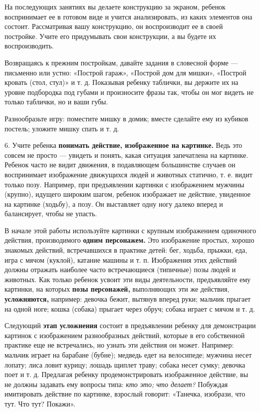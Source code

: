 \documentclass[a5paper]{book}
\renewcommand{\emph}[1]{\textit{#1}}
\begin{document}
На последующих занятиях вы делаете конструкцию за экраном, ребенок
воспринимает ее в готовом виде и учится анализировать, из каких
элементов она состоит. Рассматривая вашу конструкцию, он воспроизводит
ее в своей постройке. Учите его придумывать свои конструкции, а вы
будете их воспроизводить.

Возвращаясь к прежним постройкам, давайте задания в словесной форме ---
письменно или устно: «Построй гараж», «Построй дом для мишки», «Построй
кровать (стол, стул)» и т. д. Показывая ребенку таблички, вы держите их
на уровне подбородка под губами и произносите фразы так, чтобы он мог
видеть не только таблички, но и ваши губы.

Разнообразьте игру: поместите мишку в домик; вместе сделайте ему из
кубиков постель; уложите мишку спать и т. д.

6. Учите ребенка \textbf{понимать действие, изображенное на картинке.}
Ведь это совсем не просто --- увидеть и понять, какая ситуация
запечатлена на картинке. Ребенок часто не видит движения, в подавляющем
большинстве случаев он воспринимает изображение движущихся людей и
животных статично, т. е. видит только позу. Например, при предъявлении
картинки с изображением мужчины (крупно), идущего широким шагом, ребенок
изображает не действие, увиденное на картинке (ходьбу), а позу. Он
выставляет одну ногу далеко вперед и балансирует, чтобы не упасть.

В начале этой работы используйте картинки с крупным изображением
одиночного действия, производимого \textbf{одним персонажем.} Это
изображение простых, хорошо знакомых действий, встречавшихся в практике
детей: бег, ходьба, прыжки, еда, игра с мячом (куклой), катание машины и
т. п. Изображения этих действий должны отражать наиболее часто
встречающиеся (типичные) позы людей и животных. Как только ребенок
усвоит эти виды деятельности, предъявляйте ему картинки, на которых
\textbf{позы персонажей,} выполняющих эти же действия,
\textbf{усложняются,} например: девочка бежит, вытянув вперед руки;
мальчик прыгает на одной ноге; кошка (собака) прыгает через обруч;
собака играет с мячом и т. д.

Следующий \textbf{этап усложнения} состоит в предъявлении ребенку для
демонстрации картинок с изображением разнообразных действий, которые в
его собственной практике еще не встречались, но узнать эти действия он
может. Например: мальчик играет на барабане (бубне); медведь едет на
велосипеде; мужчина несет лопату; лиса ловит курицу; лошадь щиплет
траву; собака несет сумку; девочка поет и т. д. Предлагая ребенку
продемонстрировать изображенное действие, вы не должны задавать ему
вопросы типа: \emph{кто это; что делает?} Побуждая имитировать действие
по картинке, взрослый говорит: «Танечка, изобрази, что тут. Что тут?
Покажи».
\end{document}
